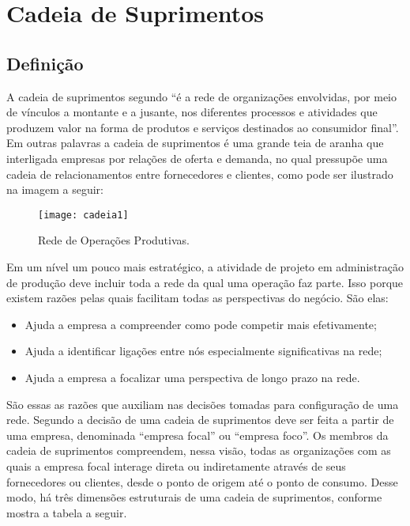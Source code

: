 \chapter[Cadeia de Suprimentos ]{Cadeia de Suprimentos}
\label{chap:cadeia}
	
	\section[Definição]{Definição}
	\label{sec:cadeia_definicao}

		A cadeia de suprimentos segundo \cite{martin} “é a rede de organizações envolvidas, por meio de vínculos a montante e a jusante, nos diferentes processos e atividades que produzem valor na forma de produtos e serviços destinados ao consumidor final”. Em outras palavras a cadeia de suprimentos é uma grande teia de aranha que interligada empresas por relações de oferta e demanda, no qual pressupõe uma cadeia de relacionamentos entre fornecedores e clientes, como pode ser ilustrado na imagem a seguir:

		\begin{figure}[h]
			\centering
			\texttt{[image: cadeia1]}
			\caption[Rede de Operações Produtivas]{Rede de Operações Produtivas.}
			\label{fig:cadeia1}
		\end{figure}

		Em um nível um pouco mais estratégico, a atividade de projeto em administração de produção deve incluir toda a rede da qual uma operação faz parte. Isso porque existem razões pelas quais facilitam todas as perspectivas do negócio. São elas:

		\begin{itemize}
			\item{Ajuda a empresa a compreender como pode competir mais efetivamente;}
			\item{Ajuda a identificar ligações entre nós especialmente significativas na rede;}
			\item{Ajuda a empresa a focalizar uma perspectiva de longo prazo na rede.}
		\end{itemize}

		São essas as razões que auxiliam nas decisões tomadas para configuração de uma rede. Segundo \cite{filho} a decisão de uma cadeia de suprimentos deve ser feita a partir de uma empresa, denominada “empresa focal” ou “empresa foco”. Os membros da cadeia de suprimentos compreendem, nessa visão, todas as organizações com as quais a empresa focal interage direta ou indiretamente através de seus fornecedores ou clientes, desde o ponto de origem até o ponto de consumo. Desse modo, há três dimensões estruturais de uma cadeia de suprimentos, conforme mostra a tabela a seguir.

